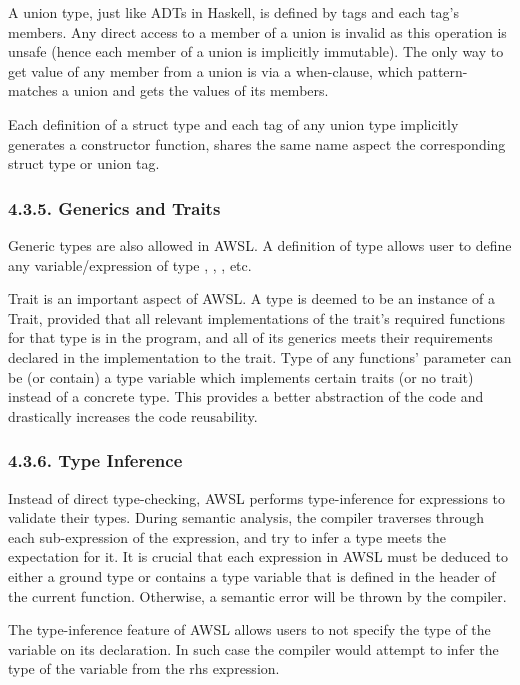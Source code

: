 \documentclass[10pt,a4paper]{report}
\begin{document}
  A union type, just like ADTs in Haskell, is defined by tags and each tag's
  members. Any direct access to a member of a union is invalid as this operation
  is unsafe (hence each member of a union is implicitly immutable). The only way
  to get value of any member from a union is via a when-clause, which
  pattern-matches a union and gets the values of its members.

  Each definition of a struct type and each tag of any union type implicitly
  generates a constructor function, shares the same name aspect the
  corresponding struct type or union tag.

  \subsubsection*{4.3.5. Generics and Traits}
  Generic types are also allowed in AWSL. A definition of type
   allows user to define any variable/expression of type
  , ,
  , etc.

  Trait is an important aspect of AWSL. A type is deemed to be an instance of a
  Trait, provided that all relevant implementations of the trait's required
  functions for that type is in the program, and all of its generics meets their
  requirements declared in the implementation to the trait. Type of any
  functions' parameter can be (or contain) a type variable which implements
  certain traits (or no trait) instead of a concrete type. This provides a
  better abstraction of the code and drastically increases the code reusability. 

  \subsubsection*{4.3.6. Type Inference}
  Instead of direct type-checking, AWSL performs type-inference for expressions
  to validate their types. During semantic analysis, the compiler traverses
  through each sub-expression of the expression, and try to infer a type meets
  the expectation for it. It is crucial that each expression in AWSL must be
  deduced to either a ground type or contains a type variable that is defined in
  the header of the current function. Otherwise, a semantic error will be thrown
  by the compiler.

  The type-inference feature of AWSL allows users to not specify the type of the
  variable on its declaration. In such case the compiler would attempt to infer
  the type of the variable from the rhs expression.
\end{document}
